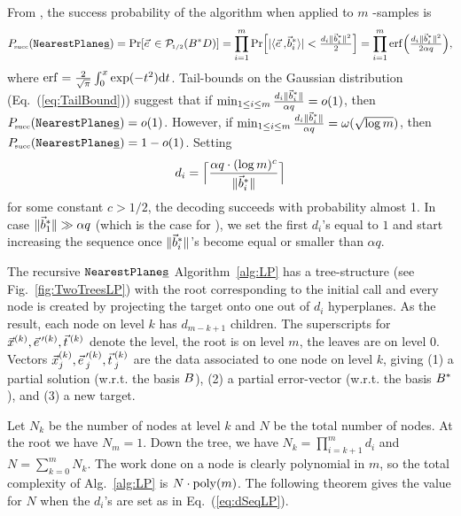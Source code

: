 From \cite{RSA:LinPei11}, the success probability of the algorithm when applied to $m$ \LWE-samples is
\begin{equation} \label{eq:LPPSucc}
	\Psucc(\NPs) = \Pr[\evec \in \FP(\wBMat \DMat)] = \prod_{i=1}^{m} \Pr \Bigl[ | \ScProd{\evec}{\wbvec_i} | < \tfrac{d_i \| \wbvec_i \|^2}{2} \Bigr] = \prod_{i=1}^{m} \erf \Bigl( \tfrac{d_i \| \wbvec_i \|^2}{2 \alpha q} \Bigr),
\end{equation}
where $\operatorname{erf} = \frac{2}{\sqrt{\pi}} \int_0^x \exp(-t^2) \mathrm{d} t$. Tail-bounds on the Gaussian distribution (Eq.~(\ref{eq:TailBound})) suggest that if $\min_{1 \leq i \leq m} \frac{d_i \| \vec b^*_i \|}{ \alpha q} = o(1)$, then $P\mkern-4mu_{\mbox{\tiny succ}}(\texttt{NearestPlane\underline{s}}) = o(1)$. However, if $\min_{1 \leq i \leq m} \frac{d_i \| \vec b^*_i \|}{ \alpha q} = \omega(\sqrt{\log m})$, then $P\mkern-4mu_{\mbox{\tiny succ}}(\texttt{NearestPlane\underline{s}}) = 1 - o(1)$.  Setting 
\begin{equation} \label{eq:dSeqLP}
	d_i = \Bigl\lceil \frac{\alpha q \cdot (\log m)^{c}}{ \| \vec b^*_i \|} \Bigr\rceil
\end{equation}
for some constant $c > 1/2$, the decoding succeeds with probability almost 1. In case $\|\vec b^*_1\| \gg \alpha q$ (which is the case for \LWE), we set the first $d_i$'s equal to $1$ and start increasing the sequence once $\| \vec b^*_i \|$'s become equal or smaller than $\alpha q$. 

The recursive $\texttt{NearestPlane\underline{s}}$ Algorithm~\ref{alg:LP} has a tree-structure (see Fig.~\ref{fig:TwoTreesLP}) with the root corresponding to the initial call and every node is created by projecting the target onto one out of $d_i$ hyperplanes. As the result, each node on level $k$ has $d_{m-k+1}$ children. The superscripts for $\xvec^{(k)}, \evec'^{(k)}, \tvec^{(k)}$ denote the level, the root is on level $m$, the leaves are on level 0. Vectors $\xvec^{(k)}_j, \evec'^{(k)}_j, \tvec^{(k)}_j$ are the data associated to one node on level $k$, giving (1) a partial solution (w.r.t. the basis $B$), (2) a partial error-vector (w.r.t. the basis $B^*$), and (3) a new target. 

Let $N_k$ be the number of nodes at level $k$ and $N$ be the total number of nodes. At the root we have $N_m = 1$. Down the tree, we have $N_k = \prod_{i=k+1}^m d_i$ and $N = \sum_{k=0}^m N_k$. The work done on a node is clearly polynomial in $m$, so the total complexity of Alg.~\ref{alg:LP} is $N \cdot \mathrm{poly}(m)$. The following theorem gives the value for $N$ when the $d_i$'s are set as in Eq.~(\ref{eq:dSeqLP}).

